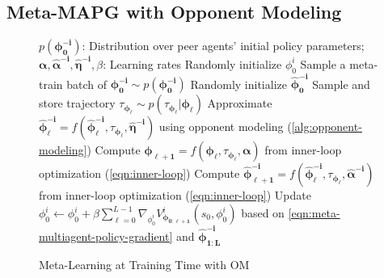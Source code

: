 \subsection{Meta-MAPG with Opponent Modeling}\label{sec:opponent-modelling}
\vspace{-0.5cm}
\begin{figure}[H]
\begin{minipage}[t]{0.49\textwidth}
\begin{algorithm}[H]
	\caption{Meta-Learning at Training Time with OM}\label{alg:meta-train-om}  
	\small
	\begin{algorithmic}[1]
	    \REQUIRE $p(\bm{\phi}^{\bm{-i}}_{\bm{0}})$: Distribution over peer agents' initial policy parameters; $\bm{\alpha},\bm{\hat{\alpha}}^{\bm{-i}},\bm{\hat{\eta}}^{\bm{-i}},\beta$: Learning rates 
	    \STATE Randomly initialize $\phi^{i}_{0}$
		    \STATE Sample a meta-train batch of $\bm{\phi}^{\bm{-i}}_{\bm{0}}\sim p(\bm{\phi}^{\bm{-i}}_{\bm{0}})$
		         \STATE Randomly initialize $\bm{\hat{\phi}}^{\bm{-i}}_{\bm{0}}$
		            \STATE Sample and store trajectory $\tau_{\bm{\phi}_{\bm{\ell}}}\sim p(\tau_{\bm{\phi}_{\bm{\ell}}}|\bm{\phi}_{\bm{\ell}})$
		            \STATE Approximate $\bm{\hat{\phi}}^{\bm{-i}}_{\bm{\ell}}=f(\bm{\hat{\phi}}^{\bm{-i}}_{\bm{\ell}},\tau_{\bm{\phi}_{\bm{\ell}}},\bm{\hat{\eta}}^{\bm{-i}})$ using opponent modeling (\cref{alg:opponent-modeling})
		            \STATE Compute $\bm{\phi}_{\bm{\ell+1}}=f(\bm{\phi}_{\bm{\ell}},\tau_{\bm{\phi}_{\bm{\ell}}},\bm{\alpha})$ from inner-loop optimization (\cref{eqn:inner-loop})
		            \STATE Compute $\bm{\hat{\phi}}^{\bm{-i}}_{\bm{\ell+1}}=f(\bm{\hat{\phi}}^{\bm{-i}}_{\bm{\ell}},\tau_{\bm{\phi}_{\bm{\ell}}},\bm{\hat{\alpha}}^{\bm{-i}})$ from inner-loop optimization (\cref{eqn:inner-loop})
		        \ENDFOR
		    \ENDFOR
		    \STATE Update $\phi^{i}_{0}\leftarrow\phi^{i}_{0}+\beta\sum_{\ell=0}^{L-1}\nabla_{\phi^{i}_{0}}V^{i}_{\bm{\phi}_{\bm{0:\ell+1}}}(s_0,\phi^{i}_{0})$ based on \cref{eqn:meta-multiagent-policy-gradient} and $\bm{\hat{\phi}}^{\bm{-i}}_{\bm{1:L}}$
		\ENDWHILE
	\end{algorithmic}
\end{algorithm}
\end{minipage}
\hfill
\begin{minipage}[t]{0.49\textwidth}
\begin{algorithm}[H]

\end{algorithm}
\end{minipage}
\end{figure}
